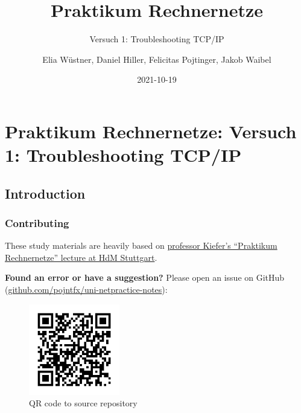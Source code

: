 \begin{titlepage}
\author{Elia Wüstner, Daniel Hiller, Felicitas Pojtinger, Jakob Waibel} 
\title{Praktikum Rechnernetze}
\subtitle{Versuch 1: Troubleshooting TCP/IP} 
\date{2021-10-19} 
\maketitle
\newpage
\end{titlepage}
\newpage

\hypertarget{praktikum-rechnernetze-versuch-1-troubleshooting-tcpip}{%
\section{Praktikum Rechnernetze: Versuch 1: Troubleshooting
TCP/IP}\label{praktikum-rechnernetze-versuch-1-troubleshooting-tcpip}}

\hypertarget{introduction}{%
\subsection{Introduction}\label{introduction}}

\hypertarget{contributing}{%
\subsubsection{Contributing}\label{contributing}}

These study materials are heavily based on
\href{https://www.hdm-stuttgart.de/vorlesung_detail?vorlid=5212254}{professor
Kiefer's ``Praktikum Rechnernetze'' lecture at HdM Stuttgart}.

\textbf{Found an error or have a suggestion?} Please open an issue on
GitHub
(\href{https://github.com/pojntfx/uni-netpractice-notes}{github.com/pojntfx/uni-netpractice-notes}):

\begin{figure}
\centering
\includegraphics[width=1.5625in,height=\textheight]{./static/qr.png}
\caption{QR code to source repository}
\end{figure}


